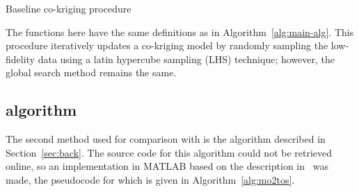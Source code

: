\begin{algorithm}[h!] 
\caption{Baseline co-kriging procedure}
\label{alg:co-kriging}
{\footnotesize
\begin{algorithmic}[1]
 
  
   
     
  \ENDIF
   
   
   
   
   
\ENDWHILE
\end{algorithmic}
}
\end{algorithm}

The functions here have the same definitions as in Algorithm~\ref{alg:main-alg}. This procedure iteratively updates a co-kriging model by randomly sampling the low-fidelity data using a latin hypercube sampling (LHS) technique; however, the global search method remains the same.

\subsection{\motos{} algorithm}

The second method used for comparison with \AlgName{} is the \motos{} algorithm described in Section~\ref{sec:back}. The source code for this algorithm could not be retrieved online, so an implementation in MATLAB based on the description in~\cite{xu2016mo2tos} was made, the pseudocode for which is given in Algorithm~\ref{alg:mo2tos}.

